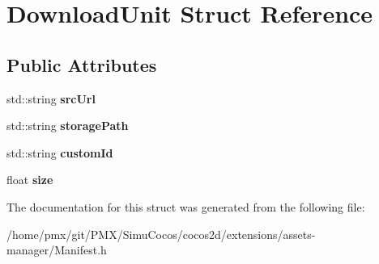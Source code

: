 \hypertarget{structDownloadUnit}{}\section{Download\+Unit Struct Reference}
\label{structDownloadUnit}
\subsection*{Public Attributes}
\begin{DoxyCompactItemize}
\item 
\mbox{\label{structDownloadUnit_a3175b7567b5c244e183bd8511e72865c}} 
std\+::string {\bfseries src\+Url}
\item 
\mbox{\label{structDownloadUnit_aa6d347452ba5920a05328ea3b529d443}} 
std\+::string {\bfseries storage\+Path}
\item 
\mbox{\label{structDownloadUnit_a40620788ba718bd8cbf8383e242ae41d}} 
std\+::string {\bfseries custom\+Id}
\item 
\mbox{\label{structDownloadUnit_a5477d2fdb227d3f85c6b41ffb2f3da26}} 
float {\bfseries size}
\end{DoxyCompactItemize}


The documentation for this struct was generated from the following file\+:\begin{DoxyCompactItemize}
\item 
/home/pmx/git/\+P\+M\+X/\+Simu\+Cocos/cocos2d/extensions/assets-\/manager/Manifest.\+h\end{DoxyCompactItemize}
